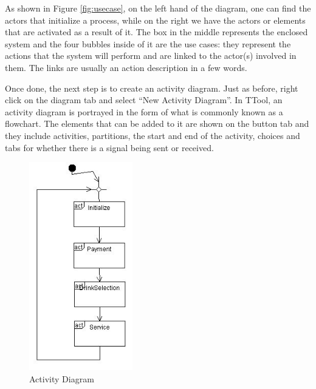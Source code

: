 \documentclass[12pt]{article}
\begin{document}
As shown in Figure \ref{fig:usecase}, on the left hand of the diagram, one can find the actors that initialize a process, while on the right we have the actors or elements that are activated as a result of it. The box in the middle represents the enclosed system and the four bubbles inside of it are the use cases: they represent the actions that the system will perform and are linked to the actor(s) involved in them. The links are usually an action description in a few words.

Once done, the next step is to create an activity diagram. Just as before, right click on the diagram tab and select “New Activity Diagram”.  In TTool, an activity diagram is portrayed in the form of what is commonly known as a flowchart. The elements that can be added to it are shown on the button tab and they include activities, partitions, the start and end of the activity, choices and tabs for whether there is a signal being sent or received. 

\begin{figure}[htbp]
\centering
\includegraphics[width=0.4\textwidth]{fig/actdiagram.jpg}
\caption{Activity Diagram} \label{fig:actdiagram}
\end{figure}
 
\end{document}
